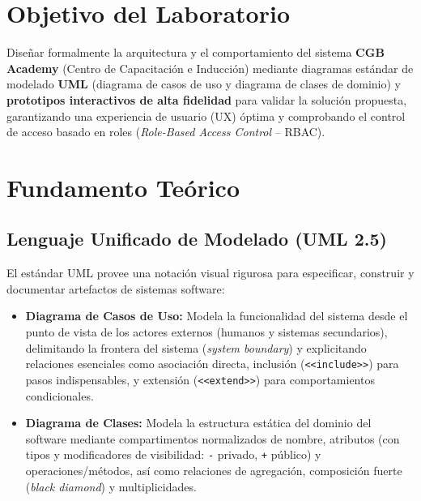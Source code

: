 \documentclass[11pt,a4paper]{article}
\begin{document}
\tableofcontents
\newpage

\section{Objetivo del Laboratorio}
Diseñar formalmente la arquitectura y el comportamiento del sistema \textbf{CGB Academy} (Centro de Capacitación e Inducción) mediante diagramas estándar de modelado \textbf{UML} (diagrama de casos de uso y diagrama de clases de dominio) y \textbf{prototipos interactivos de alta fidelidad} para validar la solución propuesta, garantizando una experiencia de usuario (UX) óptima y comprobando el control de acceso basado en roles (\textit{Role-Based Access Control} -- RBAC).

\section{Fundamento Teórico}

\subsection{Lenguaje Unificado de Modelado (UML 2.5)}
El estándar UML provee una notación visual rigurosa para especificar, construir y documentar artefactos de sistemas software:
\begin{itemize}[leftmargin=*]
    \item \textbf{Diagrama de Casos de Uso:} Modela la funcionalidad del sistema desde el punto de vista de los actores externos (humanos y sistemas secundarios), delimitando la frontera del sistema (\textit{system boundary}) y explicitando relaciones esenciales como asociación directa, inclusión (\texttt{<<include>>}) para pasos indispensables, y extensión (\texttt{<<extend>>}) para comportamientos condicionales.
    \item \textbf{Diagrama de Clases:} Modela la estructura estática del dominio del software mediante compartimentos normalizados de nombre, atributos (con tipos y modificadores de visibilidad: \texttt{-} privado, \texttt{+} público) y operaciones/métodos, así como relaciones de agregación, composición fuerte (\textit{black diamond}) y multiplicidades.
\end{itemize}
\end{document}
